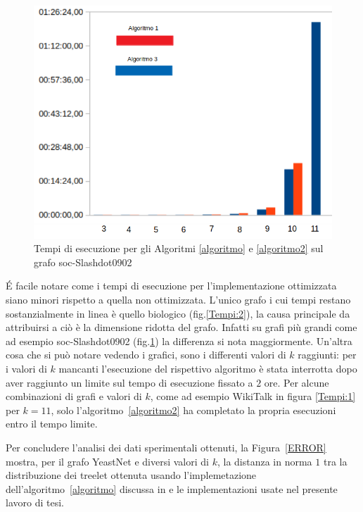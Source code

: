 \begin{figure}[htbp]
	\includegraphics[width=15.4cm]{capitolo4/tempiSOC}
	\caption{Tempi di esecuzione per gli Algoritmi \ref{algoritmo} e \ref{algoritmo2} sul grafo soc-Slashdot0902}
	\label{Tempi:4}
\end{figure}

É facile notare come i tempi di esecuzione per l'implementazione ottimizzata siano minori rispetto a quella non ottimizzata.
L'unico grafo i cui tempi restano sostanzialmente in linea è quello biologico (fig.\ref{Tempi:2}), la causa principale da attribuirsi a ciò è la dimensione ridotta del grafo. 
Infatti su grafi più grandi come ad esempio soc-Slashdot0902 (fig.\ref{Tempi:4}) la differenza si nota maggiormente. 
Un'altra cosa che si può notare vedendo i grafici, sono i differenti valori di $ k $ raggiunti: per i valori di $k$ mancanti l'esecuzione del rispettivo algoritmo è stata interrotta dopo aver raggiunto un limite sul tempo di esecuzione fissato a $2$ ore.
Per alcune combinazioni di grafi e valori di $k$, come ad esempio WikiTalk in figura \ref{Tempi:1} per $ k=11$, solo l'algoritmo~\ref{algoritmo2} ha completato la propria esecuzioni entro il tempo limite.

Per concludere l'analisi dei dati sperimentali ottenuti,
la Figura~\ref{ERROR} mostra, per il grafo YeastNet e diversi valori di $k$, la distanza in norma $1$ tra 
la distribuzione dei treelet ottenuta usando l'implemetazione dell'algoritmo~\ref{algoritmo} discussa in \cite{bressan2019motivo} e le implementazioni usate nel presente lavoro di tesi.

